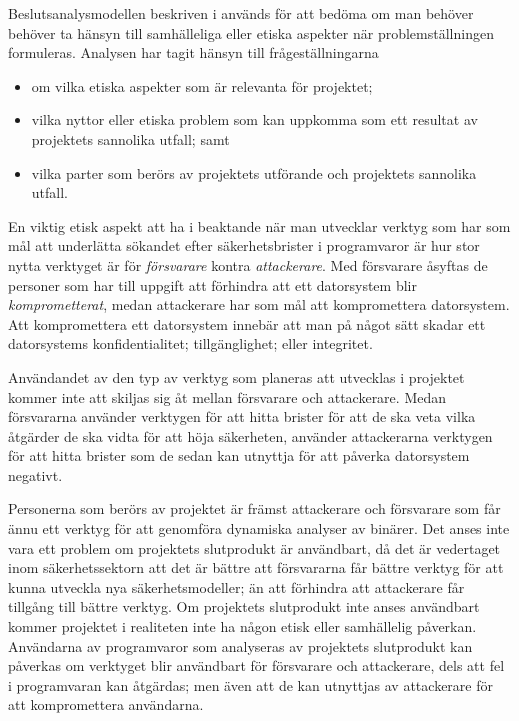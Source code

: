 Beslutsanalysmodellen beskriven i \cite{föreskrifter} används för att bedöma om man behöver behöver ta hänsyn till samhälleliga eller etiska aspekter när problemställningen formuleras.
Analysen har tagit hänsyn till frågeställningarna
\begin{itemize}
    \item om vilka etiska aspekter som är relevanta för projektet;
    \item vilka nyttor eller etiska problem som kan uppkomma som ett resultat av projektets sannolika utfall; samt
    \item vilka parter som berörs av projektets utförande och projektets sannolika utfall.
\end{itemize}

En viktig etisk aspekt att ha i beaktande när man utvecklar verktyg som har som mål att underlätta sökandet efter säkerhetsbrister i programvaror är hur stor nytta verktyget är för \emph{försvarare} kontra \emph{attackerare}.
Med försvarare åsyftas de personer som har till uppgift att förhindra att ett datorsystem blir \emph{komprometterat}, medan attackerare har som mål att kompromettera datorsystem.
Att kompromettera ett datorsystem innebär att man på något sätt skadar ett datorsystems konfidentialitet; tillgänglighet; eller integritet.

Användandet av den typ av verktyg som planeras att utvecklas i projektet kommer inte att skiljas sig åt mellan försvarare och attackerare.
Medan försvararna använder verktygen för att hitta brister för att de ska veta vilka åtgärder de ska vidta för att höja säkerheten, använder attackerarna verktygen för att hitta brister som de sedan kan utnyttja för att påverka datorsystem negativt.

Personerna som berörs av projektet är främst attackerare och försvarare som får ännu ett verktyg för att genomföra dynamiska analyser av binärer.
Det anses inte vara ett problem om projektets slutprodukt är användbart, då det är vedertaget inom säkerhetssektorn att det är bättre att försvararna får bättre verktyg för att kunna utveckla nya säkerhetsmodeller; än att förhindra att attackerare får tillgång till bättre verktyg.
Om projektets slutprodukt inte anses användbart kommer projektet i realiteten inte ha någon etisk eller samhällelig påverkan.
Användarna av programvaror som analyseras av projektets slutprodukt kan påverkas om verktyget blir användbart för försvarare och attackerare, dels att fel i programvaran kan åtgärdas; men även att de kan utnyttjas av attackerare för att kompromettera användarna.
